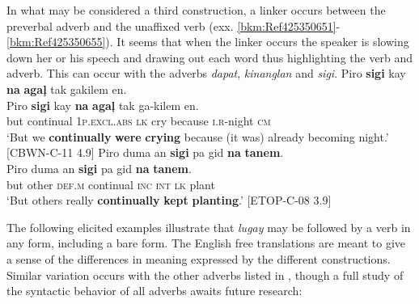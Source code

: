 In what may be considered a third construction, a linker occurs between the preverbal adverb and the unaffixed verb (exx. \ref{bkm:Ref425350651}{}-\ref{bkm:Ref425350655}). It seems that when the linker occurs the speaker is slowing down her or his speech and drawing out each word thus highlighting the verb and adverb. This can occur with the adverbs \textit{dapat}, \textit{kinanglan} and \textit{sigi}.
\ea
\label{bkm:Ref425350651}
Piro  \textbf{sigi}  kay  \textbf{na}  \textbf{agaļ}  tak  gakilem  en. \\\smallskip
 \gll Piro  \textbf{sigi}  kay  \textbf{na}  \textbf{agaļ}  tak  ga-kilem  en. \\
but  continual  1\textsc{p.excl.abs}  \textsc{lk}  cry  because  \textsc{i.r}-night  \textsc{cm} \\
\glt ‘But we \textbf{continually} \textbf{were} \textbf{crying} because (it was) already becoming night.’ [CBWN-C-11 4.9]
\z
\ea
\label{bkm:Ref425350655}
Piro  duma  an  \textbf{sigi}  pa  gid  \textbf{na}  \textbf{tanem}. \\\smallskip
 \gll Piro  duma  an  \textbf{sigi}  pa  gid  \textbf{na}  \textbf{tanem}. \\
but  other  \textsc{def.m} continual  \textsc{inc}  \textsc{int}  \textsc{lk}  plant \\
\glt`But others really \textbf{continually} \textbf{kept} \textbf{planting}.’ [ETOP-C-08 3.9]
\z

The following elicited examples illustrate that \textit{lugay} may be followed by a verb in any form, including a bare form. The English free translations are meant to give a sense of the differences in meaning expressed by the different constructions. Similar variation occurs with the other adverbs listed in \textsc{}, though a full study of the syntactic behavior of all adverbs awaits future research:

